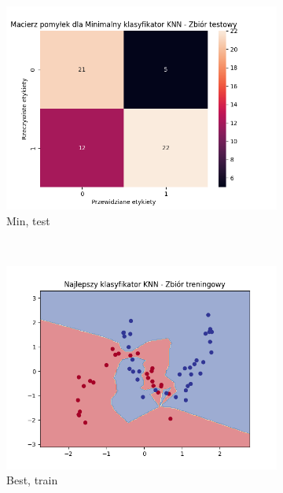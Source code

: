 \documentclass[12pt]{article}
\newcommand*{\subfigwidth}{0.24\textwidth}
\begin{document}
\begin{figure}[H]
\begin{subfigure}[t]{\subfigwidth}
        \includegraphics[width=\linewidth]{img/exp_3/knn/2_3/min/test_matrix.png}
        \caption{Min, test}
    \end{subfigure} 
    \\
    \begin{subfigure}[t]{\subfigwidth}
        \includegraphics[width=\linewidth]{img/exp_3/knn/2_3/best/train_boundary.png}
        \caption{Best, train}
    \end{subfigure}
    \hfill
    \begin{subfigure}[t]{\subfigwidth}

\end{subfigure}
\end{figure}
\end{document}
